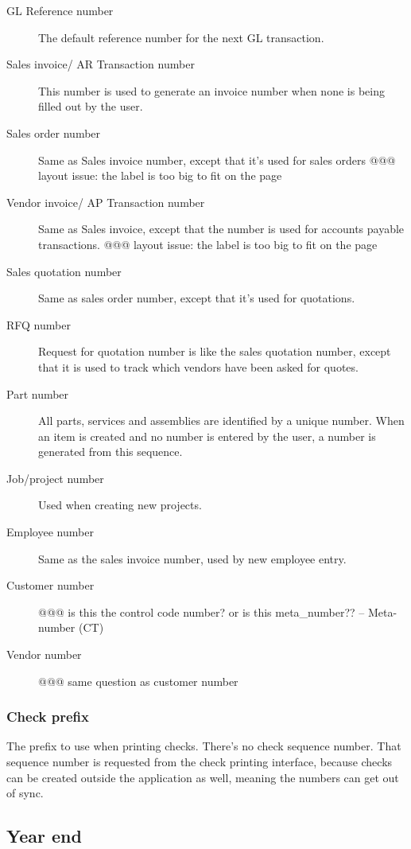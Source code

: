 \begin{description}
\item [GL Reference number] The default reference number for the next GL transaction.
\item [Sales invoice/ AR Transaction number] This number is used to generate an invoice
number when none is being filled out by the user.
\item [Sales order number ] Same as Sales invoice number, except that it's used for sales orders @@@ layout issue: the label is too big to fit on the page
\item [Vendor invoice/ AP Transaction number] Same as Sales invoice, except that the number
is used for accounts payable transactions. @@@ layout issue: the label is too big to fit on the page 
\item [Sales quotation number] Same as sales order number, except that it's used for quotations.
\item [RFQ number] Request for quotation number is like the sales quotation number, except
that it is used to track which vendors have been asked for quotes.
\item [Part number] All parts, services and assemblies are identified by a unique number.
When an item is created and no number is entered by the user, a number is generated
from this sequence.
\item [Job/project number] Used when creating new projects.
\item [Employee number ] Same as the sales invoice number, used by new employee entry.
\item [Customer number] @@@ is this the control code number? or is this
meta\_number?? -- Meta-number (CT) 
\item [Vendor number] @@@ same question as customer number
\end{description}

\subsubsection{Check prefix}
\label{subsubsec-company-config-defaults-check-prefix}

 The prefix to use when printing checks. There's no check sequence number. That sequence number is requested from the check printing interface, because
checks can be created outside the application as well, meaning the numbers can
get out of sync.

\subsection{Year end}
\label{subsec-company-config-year-end}

